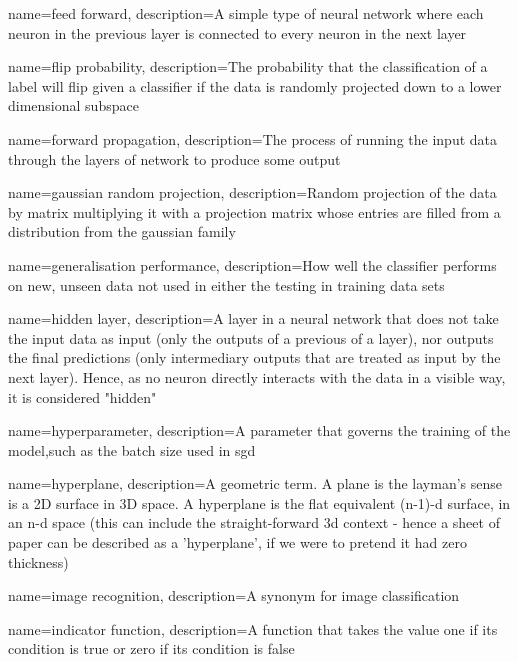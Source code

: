 {
    name=feed forward,
    description={A simple type of neural network where each neuron in the previous layer is connected to every neuron in the next layer} 
}

{
    name=flip probability,
    description={The probability that the classification of a label will flip given a classifier if the data is randomly projected down to a lower dimensional subspace}
}

{
    name=forward propagation,
    description={The process of running the input data through the layers of network to produce some output}
}

{
    name=gaussian random projection,
    description={Random projection of the data by matrix multiplying it with a projection matrix whose entries are filled from a distribution from the gaussian family}
}

{
    name=generalisation performance,
    description={How well the classifier performs on new, unseen data not used in either the testing in training data sets}
}

 {
    name=hidden layer,
    description={A layer in a neural network that does not take the input data as input (only the outputs of a previous of a layer), nor outputs the final predictions (only intermediary outputs that are treated as input by the next layer). Hence, as no neuron directly interacts with the data in a visible way, it is considered "hidden"}
}

{
    name=hyperparameter,
    description={A parameter that governs the training of the model,such as the batch size used in \gls{sgd}} 
}

{
    name=hyperplane,
    description={A geometric term. A plane is the layman's sense is a 2D surface in 3D space. A hyperplane is the flat equivalent (n-1)-d surface, in an n-d space (this can include the straight-forward 3d context - hence a sheet of paper can be described as a 'hyperplane', if we were to pretend it had zero thickness)}
}

{
    name=image recognition,
    description={A synonym for image classification}
}

{
    name=indicator function,
    description={A function that takes the value one if its condition is true or zero if its condition is false}
}

